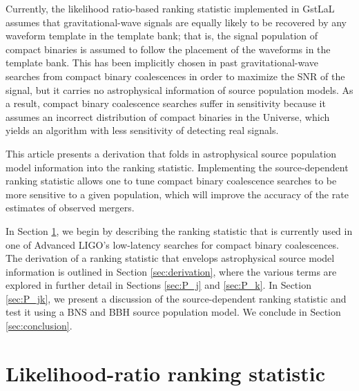 \documentclass[twocolumn,showpacs,unsortedaddress,superscriptaddress,showkeys,nofootinbib,preprintnumbers,letterpaper]{revtex4-1}
\begin{document}
Currently, the likelihood ratio-based ranking statistic implemented in GstLaL assumes that gravitational-wave signals are equally likely to be recovered by any waveform template in the template bank; that is, the signal population of compact binaries is assumed to follow the placement of the waveforms in the template bank. This has been implicitly chosen in past gravitational-wave searches from compact binary coalescences in order to maximize the SNR of the signal, but it carries no astrophysical information of source population models. As a result, compact binary coalescence searches suffer in sensitivity because it assumes an incorrect distribution of compact binaries in the Universe, which yields an algorithm with less sensitivity of detecting real signals. 

This article presents a derivation that folds in astrophysical source population model information into the ranking statistic. Implementing the source-dependent ranking statistic allows one to tune compact binary coalescence searches to be more sensitive to a given population, which will improve the accuracy of the rate estimates of observed mergers. 

In Section \ref{sec:rankingstat}, we begin by describing the ranking statistic that is currently used in one of Advanced LIGO's low-latency searches for compact binary coalescences. The derivation of a ranking statistic that envelops astrophysical source model information is outlined in Section \ref{sec:derivation}, where the various terms are explored in further detail in Sections \ref{sec:P_j} and \ref{sec:P_k}. In Section \ref{sec:P_jk}, we present a discussion of the source-dependent ranking statistic and test it using a BNS and BBH source population model. We conclude in Section \ref{sec:conclusion}.


\section{Likelihood-ratio ranking statistic} \label{sec:rankingstat}
\end{document}
